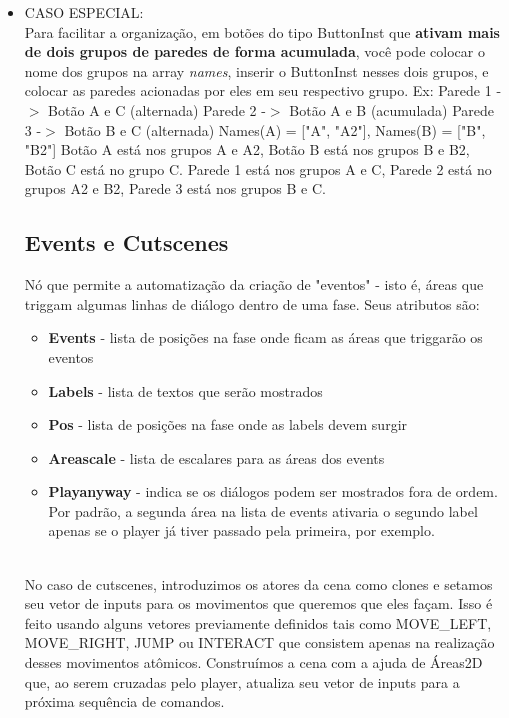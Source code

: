 \documentclass[a4paper, 11pt]{article}
\begin{document}
\begin{itemize}
				\item CASO ESPECIAL: \\
				Para facilitar a organização, em botões do tipo ButtonInst que \textbf{ativam mais de dois grupos de paredes de forma acumulada}, você pode colocar o nome dos grupos na array \textit{names}, inserir o ButtonInst nesses dois grupos, e colocar as paredes acionadas por eles em seu respectivo grupo.
				Ex:
				Parede 1 -$>$ Botão A e C (alternada)
				Parede 2 -$>$ Botão A e B (acumulada) 
 				Parede 3 -$>$ Botão B e C (alternada)
 				Names(A) = ["A", "A2"], Names(B) = ["B", "B2"]
 				Botão A está nos grupos A e A2, Botão B está nos grupos B e B2, Botão C está no grupo C.
 				Parede 1 está nos grupos A e C, Parede 2 está no grupos A2 e B2, Parede 3 está nos grupos B e C.

 			\subsection{Events e Cutscenes}
 				Nó que permite a automatização da criação de "eventos" - isto é, áreas que triggam algumas linhas de diálogo dentro de uma fase. Seus atributos são:
 				\begin{itemize}
 					\item \textbf{Events} - lista de posições na fase onde ficam as áreas que triggarão os eventos
 					\item \textbf{Labels} - lista de textos que serão mostrados
 					\item \textbf{Pos} - lista de posições na fase onde as labels devem surgir
 					\item \textbf{Areascale} - lista de escalares para as áreas dos events
 					\item \textbf{Playanyway} - indica se os diálogos podem ser mostrados fora de ordem. Por padrão, a segunda área na lista de events ativaria o segundo label apenas se o player já tiver passado pela primeira, por exemplo.
 				\end{itemize}
 				\\
 				No caso de cutscenes, introduzimos os atores da cena como clones e setamos seu vetor de inputs para os movimentos que queremos que eles façam. Isso é feito usando alguns vetores previamente definidos tais como MOVE\_LEFT, MOVE\_RIGHT, JUMP ou INTERACT que consistem apenas na realização desses movimentos atômicos. Construímos a cena com a ajuda de Áreas2D que, ao serem cruzadas pelo player, atualiza seu vetor de inputs para a próxima sequência de comandos.



\end{itemize}
\end{document}

